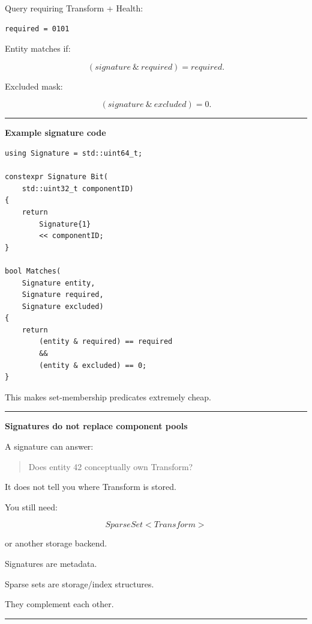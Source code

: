 Query requiring Transform + Health:

\begin{verbatim}
required = 0101
\end{verbatim}

Entity matches if:

\[
\boxed{
(signature\ \&\ required)=required.
}
\]

Excluded mask:

\[
(signature\ \&\ excluded)=0.
\]

\begin{center}\rule{0.5\linewidth}{0.5pt}\end{center}

\textbf{Example signature code}

\begin{verbatim}
using Signature = std::uint64_t;

constexpr Signature Bit(
    std::uint32_t componentID)
{
    return
        Signature{1}
        << componentID;
}

bool Matches(
    Signature entity,
    Signature required,
    Signature excluded)
{
    return
        (entity & required) == required
        &&
        (entity & excluded) == 0;
}
\end{verbatim}

This makes set-membership predicates extremely cheap.

\begin{center}\rule{0.5\linewidth}{0.5pt}\end{center}

\textbf{Signatures do not replace component pools}

A signature can answer:

\begin{quote}
Does entity 42 conceptually own Transform?
\end{quote}

It does not tell you where Transform is stored.

You still need:

\[
SparseSet<Transform>
\]

or another storage backend.

Signatures are metadata.

Sparse sets are storage/index structures.

They complement each other.

\begin{center}\rule{0.5\linewidth}{0.5pt}\end{center}

